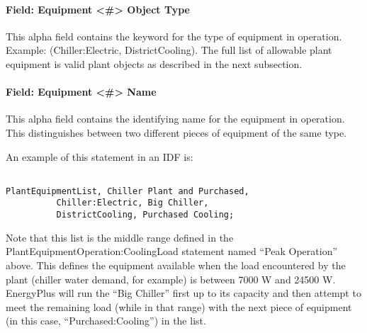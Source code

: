 \paragraph{Field: Equipment \textless{}\#\textgreater{} Object Type}\label{field-equipment-object-type-1}

This alpha field contains the keyword for the type of equipment in operation. Example: (Chiller:Electric, DistrictCooling). The full list of allowable plant equipment is valid plant objects as described in the next subsection.

\paragraph{Field: Equipment \textless{}\#\textgreater{} Name}\label{field-equipment-name-1}

This alpha field contains the identifying name for the equipment in operation. This distinguishes between two different pieces of equipment of the same type.

An example of this statement in an IDF is:

\begin{lstlisting}

PlantEquipmentList, Chiller Plant and Purchased,
          Chiller:Electric, Big Chiller,
          DistrictCooling, Purchased Cooling;
\end{lstlisting}

Note that this list is the middle range defined in the PlantEquipmentOperation:CoolingLoad statement named ``Peak Operation'' above. This defines the equipment available when the load encountered by the plant (chiller water demand, for example) is between 7000 W and 24500 W. EnergyPlus will run the ``Big Chiller'' first up to its capacity and then attempt to meet the remaining load (while in that range) with the next piece of equipment (in this case, ``Purchased:Cooling'') in the list.